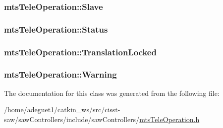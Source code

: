 \hypertarget{classmts_tele_operation_a7199e0f2fd813b121f3a5a84aa61ee7b}{
\subsubsection[{Slave}]{ mts\-Tele\-Operation\-::\-Slave\hspace{0.3cm}{\ttfamily [protected]}}}\label{classmts_tele_operation_a7199e0f2fd813b121f3a5a84aa61ee7b}
\hypertarget{classmts_tele_operation_a905c68bfca5f949e50c436e81003944e}{
\subsubsection[{Status}]{ mts\-Tele\-Operation\-::\-Status}}\label{classmts_tele_operation_a905c68bfca5f949e50c436e81003944e}
\hypertarget{classmts_tele_operation_a7bebda6bf97eaa2f2b704021c579035c}{
\subsubsection[{Translation\-Locked}]{ mts\-Tele\-Operation\-::\-Translation\-Locked}}\label{classmts_tele_operation_a7bebda6bf97eaa2f2b704021c579035c}
\hypertarget{classmts_tele_operation_a0bb3b1d50dbb402fe291cb29d72ea333}{
\subsubsection[{Warning}]{ mts\-Tele\-Operation\-::\-Warning}}\label{classmts_tele_operation_a0bb3b1d50dbb402fe291cb29d72ea333}


The documentation for this class was generated from the following file\-:\begin{DoxyCompactItemize}
\item 
/home/adeguet1/catkin\-\_\-ws/src/cisst-\/saw/saw\-Controllers/include/saw\-Controllers/\hyperlink{mts_tele_operation_8h}{mts\-Tele\-Operation.\-h}\end{DoxyCompactItemize}
